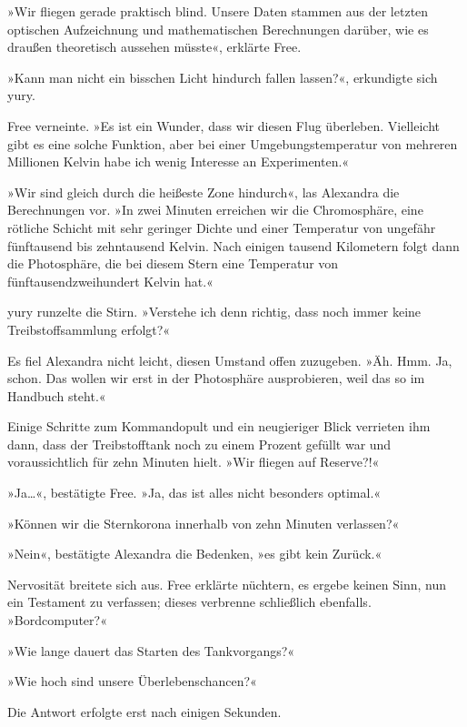 »Wir fliegen gerade praktisch blind. Unsere Daten stammen aus der letzten optischen Aufzeichnung und mathematischen Berechnungen darüber, wie es draußen theoretisch aussehen müsste«, erklärte Free.

»Kann man nicht ein bisschen Licht hindurch fallen lassen?«, erkundigte sich yury.

Free verneinte. »Es ist ein Wunder, dass wir diesen Flug überleben. Vielleicht gibt es eine solche Funktion, aber bei einer Umgebungstemperatur von mehreren Millionen Kelvin habe ich wenig Interesse an Experimenten.«

»Wir sind gleich durch die heißeste Zone hindurch«, las Alexandra die Berechnungen vor. »In zwei Minuten erreichen wir die Chromosphäre, eine rötliche Schicht mit sehr geringer Dichte und einer Temperatur von ungefähr fünftausend bis zehntausend Kelvin. Nach einigen tausend Kilometern folgt dann die Photosphäre, die bei diesem Stern eine Temperatur von fünftausendzweihundert Kelvin hat.«

yury runzelte die Stirn. »Verstehe ich denn richtig, dass noch immer keine Treibstoffsammlung erfolgt?«

Es fiel Alexandra nicht leicht, diesen Umstand offen zuzugeben. »Äh. Hmm. Ja, schon. Das wollen wir erst in der Photosphäre ausprobieren, weil das so im Handbuch steht.«

Einige Schritte zum Kommandopult und ein neugieriger Blick verrieten ihm dann, dass der Treibstofftank noch zu einem Prozent gefüllt war und voraussichtlich für zehn Minuten hielt. »Wir fliegen auf Reserve?!«

»Ja…«, bestätigte Free. »Ja, das ist alles nicht besonders optimal.«

»Können wir die Sternkorona innerhalb von zehn Minuten verlassen?«

»Nein«, bestätigte Alexandra die Bedenken, »es gibt kein Zurück.«

Nervosität breitete sich aus. Free erklärte nüchtern, es ergebe keinen Sinn, nun ein Testament zu verfassen; dieses verbrenne schließlich ebenfalls. »Bordcomputer?«


»Wie lange dauert das Starten des Tankvorgangs?«


»Wie hoch sind unsere Überlebenschancen?«

Die Antwort erfolgte erst nach einigen Sekunden. 


